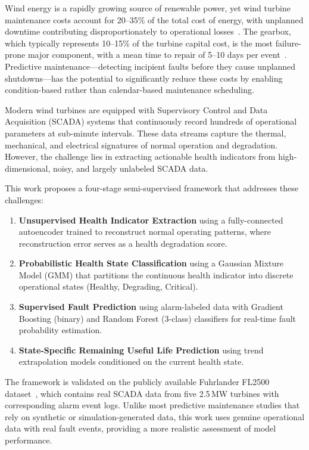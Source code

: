 \documentclass[preprint,12pt]{elsarticle}
\begin{document}
Wind energy is a rapidly growing source of renewable power, yet wind turbine maintenance costs account for 20--35\% of the total cost of energy, with unplanned downtime contributing disproportionately to operational losses~\cite{tchakoua2014}. The gearbox, which typically represents 10--15\% of the turbine capital cost, is the most failure-prone major component, with a mean time to repair of 5--10 days per event~\cite{sheng2013}. Predictive maintenance---detecting incipient faults before they cause unplanned shutdowns---has the potential to significantly reduce these costs by enabling condition-based rather than calendar-based maintenance scheduling.

Modern wind turbines are equipped with Supervisory Control and Data Acquisition (SCADA) systems that continuously record hundreds of operational parameters at sub-minute intervals. These data streams capture the thermal, mechanical, and electrical signatures of normal operation and degradation. However, the challenge lies in extracting actionable health indicators from high-dimensional, noisy, and largely unlabeled SCADA data.

This work proposes a four-stage semi-supervised framework that addresses these challenges:

\begin{enumerate}
    \item \textbf{Unsupervised Health Indicator Extraction} using a fully-connected autoencoder trained to reconstruct normal operating patterns, where reconstruction error serves as a health degradation score.
    \item \textbf{Probabilistic Health State Classification} using a Gaussian Mixture Model (GMM) that partitions the continuous health indicator into discrete operational states (Healthy, Degrading, Critical).
    \item \textbf{Supervised Fault Prediction} using alarm-labeled data with Gradient Boosting (binary) and Random Forest (3-class) classifiers for real-time fault probability estimation.
    \item \textbf{State-Specific Remaining Useful Life Prediction} using trend extrapolation models conditioned on the current health state.
\end{enumerate}

The framework is validated on the publicly available Fuhrlander FL2500 dataset~\cite{blanco2020}, which contains real SCADA data from five 2.5\,MW turbines with corresponding alarm event logs. Unlike most predictive maintenance studies that rely on synthetic or simulation-generated data, this work uses genuine operational data with real fault events, providing a more realistic assessment of model performance.
\end{document}
